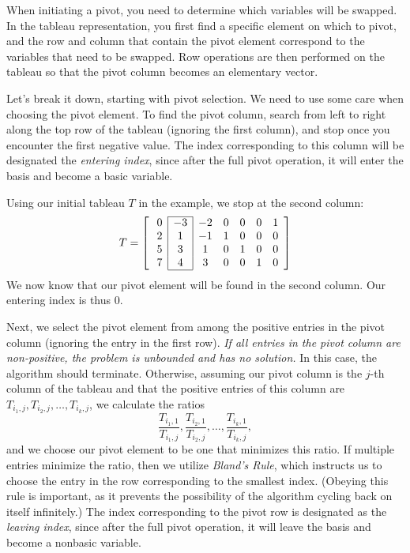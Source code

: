 When initiating a pivot, you need to determine which variables will be swapped.
In the tableau representation, you first find a specific element on which to pivot, and the row and column that contain the pivot
element correspond to the variables that need to be swapped.
Row operations are then performed on the tableau so that the pivot column becomes an elementary vector.

Let's break it down, starting with pivot selection. We need to use some care when choosing the pivot element.
To find the pivot column, search from left to right along the top row of the tableau
(ignoring the first column), and stop once you encounter the first negative value. The index corresponding
to this column will be designated the \emph{entering index}, since after the full pivot operation, it will enter
the basis and become a basic variable.

Using our initial tableau $T$ in the example, we stop at the second column:
\[ T = \left[ \:
\begin{array}{*{7}{c}}
\cline{2-2}
0 & \multicolumn{1}{|c}{-3} & \multicolumn{1}{|c}{-2} & 0 & 0 & 0 & 1\\
2 & \multicolumn{1}{|c}{1} & \multicolumn{1}{|c}{-1} & 1 & 0 & 0 & 0\\
5 & \multicolumn{1}{|c}{3} & \multicolumn{1}{|c}{1} & 0 & 1 & 0 & 0\\
7 & \multicolumn{1}{|c}{4} & \multicolumn{1}{|c}{3} & 0 & 0 & 1 & 0\\
\cline{2-2}
\end{array}
\right] \]
We now know that our pivot element will be found in the second column. Our entering index is thus $0$.

Next, we select the pivot element from among the positive entries in the pivot column (ignoring the entry in the first row).
\emph{If all entries in the pivot column are non-positive, the problem is unbounded and has no solution.} In this case, the algorithm
should terminate.
Otherwise, assuming our pivot column is the $j$-th column of the tableau and that the positive entries of this column are
$T_{i_1, j}, T_{i_2, j}, \ldots, T_{i_k, j}$, we calculate the ratios
\[
\frac{T_{i_1,1}}{T_{i_1,j}}, \frac{T_{i_2,1}}{T_{i_2,j}}, \ldots, \frac{T_{i_k,1}}{T_{i_k,j}},
\]
and we choose our pivot element to be one that minimizes this ratio. If multiple entries minimize the ratio, then we utilize
\emph{Bland's Rule}, which instructs us to choose the entry in the row corresponding to the smallest index.
(Obeying this rule is important, as it prevents the possibility of the algorithm cycling back on itself infinitely.)
The index corresponding to the pivot row is designated as the \emph{leaving index}, since after the full pivot operation,
it will leave the basis and become a nonbasic variable.

